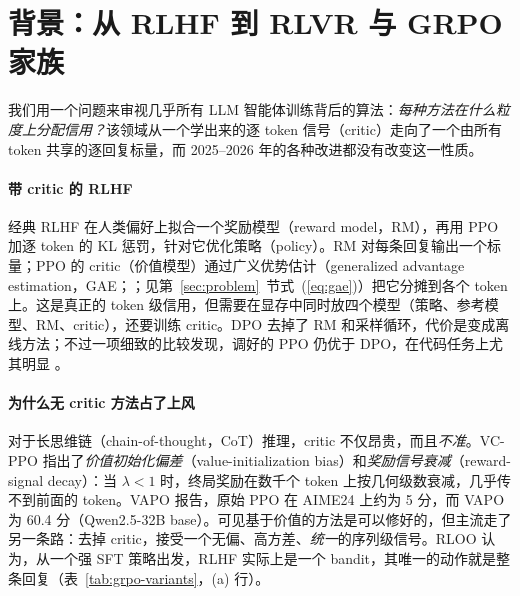 \section{背景：从 RLHF 到 RLVR 与 GRPO 家族}\label{sec:background}

我们用一个问题来审视几乎所有 LLM 智能体训练背后的算法：\emph{每种方法在什么粒度上分配信用？}该领域从一个学出来的逐 token 信号（critic）走向了一个由所有 token 共享的逐回复标量，而 2025--2026 年的各种改进都没有改变这一性质。

\paragraph{带 critic 的 RLHF}
经典 RLHF \citep{christiano2017deep,ouyang2022training} 在人类偏好上拟合一个奖励模型（reward model，RM），再用 PPO \citep{schulman2017proximal} 加逐 token 的 KL 惩罚，针对它优化策略（policy）。RM 对每条回复输出一个标量；PPO 的 critic（价值模型）通过广义优势估计（generalized advantage estimation，GAE；\citealp{schulman2015high}；见第~\ref{sec:problem}~节式~(\ref{eq:gae})）把它分摊到各个 token 上。这是真正的 token 级信用，但需要在显存中同时放四个模型（策略、参考模型、RM、critic），还要训练 critic。DPO \citep{rafailov2023direct} 去掉了 RM 和采样循环，代价是变成离线方法；不过一项细致的比较发现，调好的 PPO 仍优于 DPO，在代码任务上尤其明显 \citep{xu2024dpo}\unverified。

\paragraph{为什么无 critic 方法占了上风}
对于长思维链（chain-of-thought，CoT）推理，critic 不仅昂贵，而且\emph{不准}。VC-PPO \citep{yuan2025whats} 指出了\emph{价值初始化偏差}（value-initialization bias）和\emph{奖励信号衰减}（reward-signal decay）：当 $\lambda<1$ 时，终局奖励在数千个 token 上按几何级数衰减，几乎传不到前面的 token。VAPO \citep{yue2025vapo} 报告，原始 PPO 在 AIME24 上约为 5 分，而 VAPO 为 60.4 分（Qwen2.5-32B base）。可见基于价值的方法是可以修好的，但主流走了另一条路：去掉 critic，接受一个无偏、高方差、\emph{统一}的序列级信号。RLOO \citep{ahmadian2024back} 认为，从一个强 SFT 策略出发，RLHF 实际上是一个 bandit，其唯一的动作就是整条回复\unverified{}（表~\ref{tab:grpo-variants}，(a) 行）。

